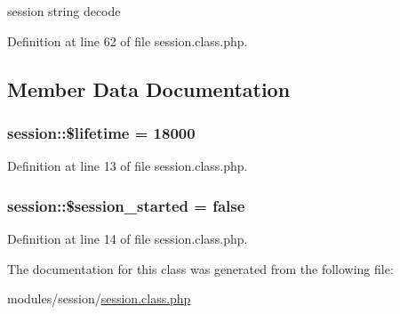 session string decode 



Definition at line 62 of file session.\+class.\+php.



\subsection{Member Data Documentation}
\subsubsection[{\texorpdfstring{\$lifetime}{$lifetime}}]{\setlength{\rightskip}{0pt plus 5cm}session\+::\$lifetime = 18000}\hypertarget{classsession_af73b8d0d1528237504be7b85f05c97ed}{}\label{classsession_af73b8d0d1528237504be7b85f05c97ed}


Definition at line 13 of file session.\+class.\+php.

\subsubsection[{\texorpdfstring{\$session\+\_\+started}{$session_started}}]{\setlength{\rightskip}{0pt plus 5cm}session\+::\$session\+\_\+started = false}\hypertarget{classsession_aae3391920555707a71e14e15f2929825}{}\label{classsession_aae3391920555707a71e14e15f2929825}


Definition at line 14 of file session.\+class.\+php.



The documentation for this class was generated from the following file\+:\begin{DoxyCompactItemize}
\item 
modules/session/\hyperlink{session_8class_8php}{session.\+class.\+php}\end{DoxyCompactItemize}
